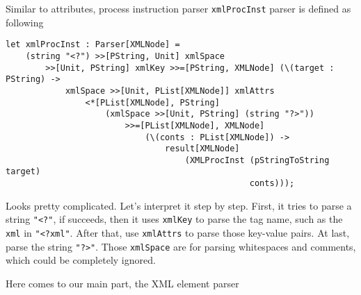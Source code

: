 Similar to attributes, process instruction parser \texttt{xmlProcInst} parser is defined as following

\begin{lstlisting}
let xmlProcInst : Parser[XMLNode] =
    (string "<?") >>[PString, Unit] xmlSpace
        >>[Unit, PString] xmlKey >>=[PString, XMLNode] (\(target : PString) ->
            xmlSpace >>[Unit, PList[XMLNode]] xmlAttrs
                <*[PList[XMLNode], PString]
                    (xmlSpace >>[Unit, PString] (string "?>"))
                        >>=[PList[XMLNode], XMLNode]
                            (\(conts : PList[XMLNode]) ->
                                result[XMLNode]
                                    (XMLProcInst (pStringToString target)
                                                 conts)));
\end{lstlisting}

Looks pretty complicated. Let's interpret it step by step. First, it tries to parse a string \texttt{"\textless?"}, if succeeds, then it uses \texttt{xmlKey} to parse the tag name, such as the \texttt{xml} in \texttt{"\textless?xml"}. After that, use \texttt{xmlAttrs} to parse those key-value pairs. At last, parse the string \texttt{"?\textgreater"}. Those \texttt{xmlSpace} are for parsing whitespaces and comments, which could be completely ignored.

Here comes to our main part, the XML element parser

